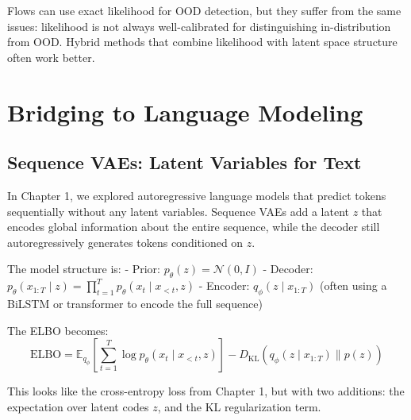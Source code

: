 \vspace{0.3cm}

Flows can use exact likelihood for OOD detection, but they suffer from the same issues: likelihood is not always well-calibrated for distinguishing in-distribution from OOD. Hybrid methods that combine likelihood with latent space structure often work better.

\vspace{2em}

\section{Bridging to Language Modeling}
\label{sec:language_modeling_bridge}

\vspace{1em}

\subsection{Sequence VAEs: Latent Variables for Text}

In Chapter 1, we explored autoregressive language models that predict tokens sequentially without any latent variables. Sequence VAEs add a latent $z$ that encodes global information about the entire sequence, while the decoder still autoregressively generates tokens conditioned on $z$.

\vspace{0.3cm}

The model structure is:
- Prior: $p_\theta(z) = \mathcal{N}(0, I)$
- Decoder: $p_\theta(x_{1:T} \mid z) = \prod_{t=1}^T p_\theta(x_t \mid x_{<t}, z)$
- Encoder: $q_\phi(z \mid x_{1:T})$ (often using a BiLSTM or transformer to encode the full sequence)

\vspace{0.3cm}

The ELBO becomes:
%
\begin{equation}
\text{ELBO} = \mathbb{E}_{q_\phi} \left[ \sum_{t=1}^T \log p_\theta(x_t \mid x_{<t}, z) \right] - D_{\text{KL}}(q_\phi(z \mid x_{1:T}) \| p(z))
\end{equation}

\vspace{0.3cm}

This looks like the cross-entropy loss from Chapter 1, but with two additions: the expectation over latent codes $z$, and the KL regularization term.

\vspace{1.5em}

